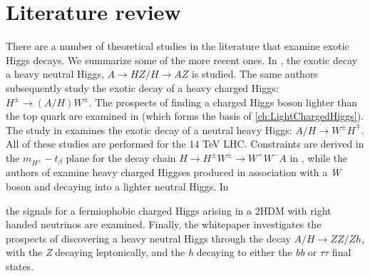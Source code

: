 \section{Literature review}\label{sec:literature_review}
There are a number of theoretical studies in the literature that examine exotic Higgs decays. We summarize some of the more recent ones. In \cite{Coleppa2014a}, the exotic decay a heavy neutral Higgs, $A\rightarrow HZ/H\rightarrow AZ$ is studied. The same authors subsequently study the exotic decay of a heavy charged Higgs: $H^\pm\rightarrow (A/H)W^\pm$. The prospects of finding a charged Higgs boson lighter than the top quark are examined in \cite{Kling2015c} (which forms the basis of \autoref{ch:LightChargedHiggs}). The study in \cite{Li:2015lra} examines the exotic decay of a neutral heavy Higgs: $A/H\rightarrow W^\pm H^\mp$. All of these studies are performed for the 14 TeV LHC.  Constraints are derived in the $m_{H^\pm}-t_\beta$ plane for the decay chain $H\rightarrow H^\pm W^\pm\rightarrow W^+W^- A$ in \cite{Dermisek:2013cxa}, while the authors of \cite{Basso:2012st} examine heavy charged Higgses produced in association with a \emph{W} boson and decaying into a lighter neutral Higgs. In {\cite{Maitra:2014qea} the signals for a fermiophobic charged Higgs arising in a $2$HDM with right handed neutrinos are examined. Finally, the whitepaper \cite{Brownson:2013lka} investigates the prospects of discovering a heavy neutral Higgs through the decay $A/H\rightarrow ZZ/Zh$, with the \emph{Z} decaying leptonically, and the \emph{h} decaying to either the \emph{bb} or $\tau\tau$ final states. 

}
